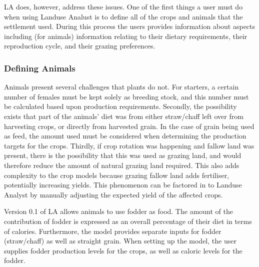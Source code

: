     LA does, however, address these issues.  One of the first things a user must do
    when using Landuse Analust is to define all of the crops and animals that the
    settlement used.  During this process the users provides information about
    aspects including (for animals) information
    relating to their dietary requirements, their reproduction cycle, and their
    grazing preferences.

    \subsubsection{Defining Animals}
    \label{definingAnimals}
      Animals present several challenges that plants do not.  For starters, a certain
      number of females must be kept solely as breeding stock, and this number must be
      calculated based upon production requirements.  Secondly, the possibility exists that
      part of the animals' diet was from either straw/chaff left over from harvesting
      crops, or directly from harvested grain.  In the case of grain being used as
      feed, the amount used must be considered when determining the production targets
      for the crops.  Thirdly, if crop rotation was happening and fallow land was
      present, there is the possibility that this was used as grazing land, and would
      therefore reduce the amount of natural grazing land required.  This also adds
      complexity to the crop models because grazing fallow land adds fertiliser,
      potentially increasing yields.  This phenomenon can be factored in to Landuse
      Analyst by manually adjusting the expected yield of the affected crops.
      
      Version 0.1 of LA allows animals to use fodder as food.  The amount of the contribution of fodder is expressed as an overall percentage of their diet in terms of calories.  Furthermore, the model provides separate inputs for fodder (straw/chaff) as well as straight grain.  When setting up the model, the user supplies fodder production levels for the crops, as well as caloric levels for the fodder.

